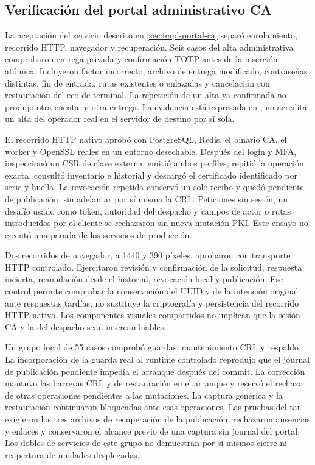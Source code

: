 \subsection{Verificaci\'on del portal administrativo CA}
\label{sec:pruebas-portal-ca}

La aceptaci\'on del servicio descrito en \cref{sec:impl-portal-ca} separ\'o
enrolamiento, recorrido HTTP, navegador y recuperaci\'on. Seis casos del alta
administrativa comprobaron entrega privada y confirmaci\'on TOTP antes de la
inserci\'on at\'omica. Incluyeron factor incorrecto, archivo de entrega modificado,
contrase\~nas distintas, fin de entrada, rutas existentes o enlazadas y cancelaci\'on
con restauraci\'on del eco de terminal. La repetici\'on de un alta ya confirmada
no produjo otra cuenta ni otra entrega. La evidencia est\'a expresada en
; no acredita un alta del operador real
en el servidor de destino por s\'i sola.

El recorrido HTTP nativo aprob\'o con PostgreSQL, Redis, el binario CA, el worker
y OpenSSL reales en un entorno desechable. Despu\'es del login y MFA, inspeccion\'o
un CSR de clave externa, emiti\'o ambos perfiles, repiti\'o la operaci\'on exacta,
consult\'o inventario e historial y descarg\'o el certificado identificado por
serie y huella. La revocaci\'on repetida conserv\'o un solo recibo y qued\'o
pendiente de publicaci\'on, sin adelantar por s\'i misma la CRL. Peticiones sin
sesi\'on, un desaf\'io usado como token, autoridad del despacho y campos de actor
o rutas introducidos por el cliente se rechazaron sin nueva mutaci\'on PKI.
Este ensayo no ejecut\'o una parada de los servicios de producci\'on.

Dos recorridos de navegador, a 1440 y 390 p\'ixeles, aprobaron con transporte
HTTP controlado. Ejercitaron revisi\'on y confirmaci\'on de la solicitud,
respuesta incierta, reanudaci\'on desde el historial, revocaci\'on local y
publicaci\'on. Ese control permite comprobar la conservaci\'on del UUID y de
la intenci\'on original ante respuestas tard\'ias; no sustituye la criptograf\'ia
y persistencia del recorrido HTTP nativo. Los componentes visuales compartidos
no implican que la sesi\'on CA y la del despacho sean intercambiables.

Un grupo focal de 55 casos comprob\'o guardas, mantenimiento CRL y respaldo.
La incorporaci\'on de la guarda real al runtime controlado reprodujo que el
journal de publicaci\'on pendiente imped\'ia el arranque despu\'es del commit.
La correcci\'on mantuvo las barreras CRL y de restauraci\'on en el arranque y
reserv\'o el rechazo de otras operaciones pendientes a las mutaciones. La
captura gen\'erica y la restauraci\'on continuaron bloqueadas ante esas operaciones.
Las pruebas del tar exigieron los tres archivos de recuperaci\'on de la
publicaci\'on, rechazaron ausencias y enlaces y conservaron el alcance previo
de una captura sin journal del portal. Los dobles de servicios de este grupo no
demuestran por s\'i mismos cierre ni reapertura de unidades desplegadas.

